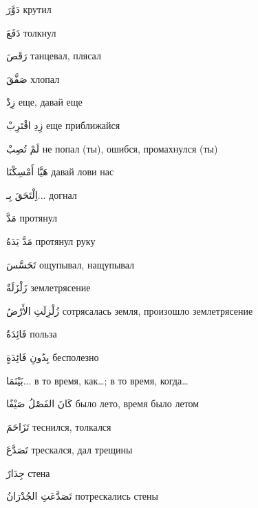 \documentclass[a5paper]{article}
\newcommand\textstyleDropCaps[1]{#1}
\newcommand\textstyleCaptioncharacters[1]{#1}
\begin{document}
\textstyleCaptioncharacters{دَوَّرَ }\textstyleDropCaps{крутил‎}

\textstyleCaptioncharacters{دَفَعَ }\textstyleDropCaps{толкнул‎}

\textstyleCaptioncharacters{رَقَصَ }\textstyleDropCaps{танцевал, плясал‎}

\textstyleCaptioncharacters{صَفَّقَ }\textstyleDropCaps{хлопал‎}

\textstyleCaptioncharacters{زِدْ }\textstyleDropCaps{еще, давай еще‎}

\textstyleCaptioncharacters{زِدِ اقْتَرِبْ }\textstyleDropCaps{еще прибли­жайся‎}

\textstyleCaptioncharacters{لَمْ تُصِبْ }\textstyleDropCaps{не попал (ты), ошибся, промахнулся (ты)‎}

\textstyleCaptioncharacters{هَيَّا أَمْسِكْنَا }\textstyleDropCaps{давай лови нас‎}

\textstyleCaptioncharacters{اِلْتَحَقَ بِـ... }\textstyleDropCaps{догнал‎}

\textstyleCaptioncharacters{مَدَّ }\textstyleDropCaps{протянул‎}

\textstyleCaptioncharacters{مَدَّ يَدَهُ }\textstyleDropCaps{протянул руку‎}

\textstyleCaptioncharacters{تَحَسَّسَ }\textstyleDropCaps{ощупывал, на­щупывал‎}

\textstyleCaptioncharacters{زَلْزَلَةٌ }\textstyleDropCaps{землетрясение‎}

\textstyleCaptioncharacters{زُلْزِلَتِ الأَرْضُ }\textstyleDropCaps{сотряса­лась земля, произошло землетрясение‎}

\textstyleCaptioncharacters{فَائِدَةٌ }\textstyleDropCaps{польза‎}

\textstyleCaptioncharacters{بِدُونِ فَائِدَةٍ }\textstyleDropCaps{бесполезно‎}

\textstyleCaptioncharacters{بَيْنَمَا... }\textstyleDropCaps{в то время, как…; в то время, когда…‎}

\textstyleCaptioncharacters{كَانَ الفَصْلُ صَيْفًا }\textstyleDropCaps{было лето, время было летом‎}

\textstyleCaptioncharacters{تَزَاحَمَ }\textstyleDropCaps{теснился, толкался‎}

\textstyleCaptioncharacters{تَصَدَّعَ }\textstyleDropCaps{трескался, дал тре­щины‎}

\textstyleCaptioncharacters{جِدَارٌ }\textstyleDropCaps{стена‎}

\textstyleCaptioncharacters{تَصَدَّعَتِ الجُدْرَانُ }\textstyleDropCaps{по­трескались стены‎}
\end{document}

